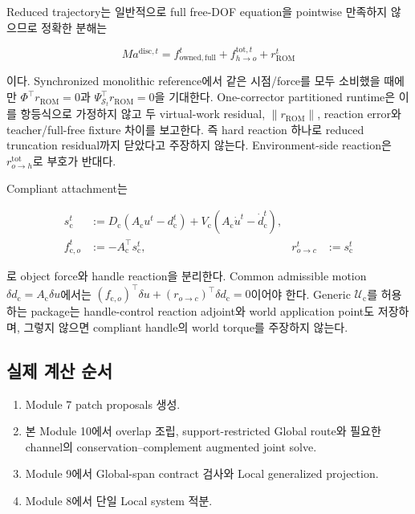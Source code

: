 \documentclass[11pt,a4paper]{article}
\begin{document}
Reduced trajectory는 일반적으로 full free-DOF equation을 pointwise 만족하지 않으므로 정확한 분해는

\begin{equation}
  Ma^{\mathrm{disc},t}
  =
  f_{\mathrm{owned,full}}^t
  +f_{h\rightarrow o}^{\mathrm{tot},t}
  +r_{\mathrm{ROM}}^t
  \label{eq:hard-reaction-rom-residual-decomposition}
\end{equation}

이다. Synchronized monolithic reference에서 같은 시점/force를 모두 소비했을 때에만
\(\Phi^\top r_{\mathrm{ROM}}=0\)과
\(\Psi_{\mathcal S_t}^\top r_{\mathrm{ROM}}=0\)을 기대한다.
One-corrector partitioned runtime은 이를 항등식으로 가정하지 않고 두 virtual-work residual,
\(\|r_{\mathrm{ROM}}\|\), reaction error와 teacher/full-free fixture 차이를 보고한다.
즉 hard reaction 하나로 reduced truncation residual까지 닫았다고 주장하지 않는다.
Environment-side reaction은
\(r_{o\rightarrow h}^{\mathrm{tot}}\)로 부호가 반대다.

Compliant attachment는

\begin{equation}
\begin{aligned}
  s_{\mathrm c}^t
  &:={}D_{\mathrm c}(A_{\mathrm c}u^t-d_{\mathrm c}^t)
  +V_{\mathrm c}(A_{\mathrm c}\dot u^t-\dot d_{\mathrm c}^t),\\
  f_{\mathrm c,o}^t&:=-A_{\mathrm c}^\top s_{\mathrm c}^t,
  &r_{o\rightarrow c}^t&:=s_{\mathrm c}^t
  \label{eq:compliant-reaction-ledger}
\end{aligned}
\end{equation}

로 object force와 handle reaction을 분리한다. Common admissible motion
\(\delta d_{\mathrm c}=A_{\mathrm c}\delta u\)에서는
\((f_{\mathrm c,o})^\top\delta u+(r_{o\rightarrow c})^\top\delta d_{\mathrm c}=0\)이어야 한다.
Generic \(\mathcal U_{\mathrm c}\)를 허용하는 package는 handle-control reaction adjoint와
world application point도 저장하며, 그렇지 않으면 compliant handle의 world torque를 주장하지 않는다.

\subsection*{실제 계산 순서}

\begin{enumerate}[leftmargin=1.7em]
  \item Module 7 patch proposals 생성.
  \item 본 Module 10에서 overlap 조립, support-restricted Global route와 필요한 channel의
  conservation--complement augmented joint solve.
  \item Module 9에서 Global-span contract 검사와 Local generalized projection.
  \item Module 8에서 단일 Local system 적분.
\end{enumerate}
\end{document}
